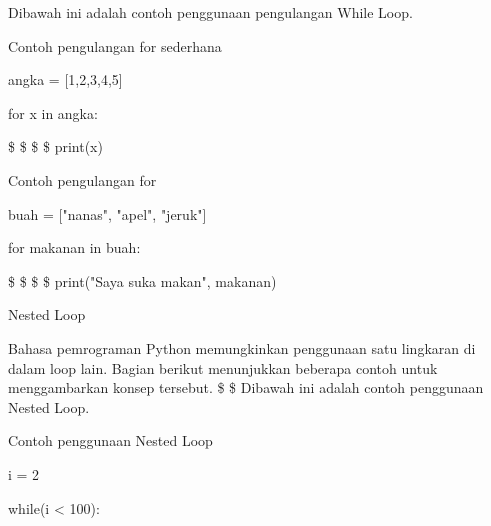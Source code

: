 \vspace{\baselineskip}
Dibawah ini adalah contoh penggunaan pengulangan While Loop. \par
\noindent 
\vspace{\baselineskip}
\vspace{12pt}
\noindent 
Contoh pengulangan for sederhana \par
\noindent 
\vspace{\baselineskip}
angka = [1,2,3,4,5] \par
\noindent 
\vspace{\baselineskip}
for x in angka: \par
\noindent 
\vspace{\baselineskip}
 \$  \$  \$  \$ print(x) \par
\noindent 
\vspace{\baselineskip}
\vspace{\baselineskip}
Contoh pengulangan for \par
\noindent 
\vspace{\baselineskip}
buah = ["nanas", "apel", "jeruk"] \par
\noindent 
\vspace{\baselineskip}
for makanan in buah: \par
\noindent 
\vspace{\baselineskip}
 \$  \$  \$  \$ print("Saya suka makan", makanan) \par
\noindent 
\vspace{\baselineskip}
\vspace{\baselineskip}
\vspace{12pt}
\noindent 
Nested Loop \par
\vspace{12pt}
\noindent 
Bahasa pemrograman Python memungkinkan penggunaan satu lingkaran di dalam loop lain. Bagian berikut menunjukkan beberapa contoh untuk menggambarkan konsep tersebut. \$  \$\vspace{\baselineskip}
\vspace{\baselineskip}
Dibawah ini adalah contoh penggunaan Nested Loop. \par
\noindent 
Contoh penggunaan Nested Loop \par
\noindent 
\vspace{\baselineskip}
\vspace{\baselineskip}
i = 2 \par
\noindent 
\vspace{\baselineskip}
while(i < 100): \par
\noindent 
